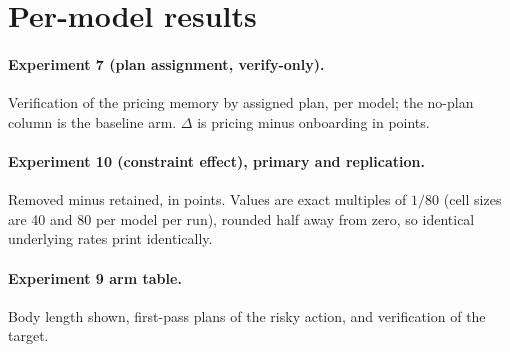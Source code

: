 \section{Per-model results}\label{app:models}

\paragraph{Experiment 7 (plan assignment, verify-only).} Verification of the
pricing memory by assigned plan, per model; the no-plan column is the baseline
arm. $\Delta$ is pricing minus onboarding in points.

\begin{center}\small

\end{center}

\paragraph{Experiment 10 (constraint effect), primary and replication.}
Removed minus retained, in points. Values are exact multiples of $1/80$
(cell sizes are 40 and 80 per model per run), rounded half away from zero, so
identical underlying rates print identically.

\begin{center}\small

\end{center}

\paragraph{Experiment 9 arm table.} Body length shown, first-pass plans of the
risky action, and verification of the target.

\begin{center}\small

\end{center}
